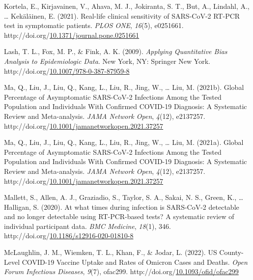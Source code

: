 \documentclass[12pt,twoside]{smiththesis}
\newlength{\cslhangindent}
\newenvironment{CSLReferences}[2] %
 {%
\setlength{\parindent}{0pt}
\ifodd #1 \everypar{\setlength{\hangindent}{\cslhangindent}}\ignorespaces\fi
\ifnum #2 > 0
\setlength{\parskip}{#2\baselineskip}
  \fi
}%
{}
\begin{document}
\begin{CSLReferences}{1}{0}
\leavevmode{}%
Kortela, E., Kirjavainen, V., Ahava, M. J., Jokiranta, S. T., But, A., Lindahl, A., \ldots{} Kekäläinen, E. (2021). Real-life clinical sensitivity of {SARS-CoV-2 RT-PCR} test in symptomatic patients. \emph{PLOS ONE}, \emph{16}(5), e0251661. http://doi.org/\href{https://doi.org/10.1371/journal.pone.0251661}{10.1371/journal.pone.0251661}

\leavevmode{}%
Lash, T. L., Fox, M. P., \& Fink, A. K. (2009). \emph{Applying {Quantitative Bias Analysis} to {Epidemiologic Data}}. {New York, NY}: {Springer New York}. http://doi.org/\href{https://doi.org/10.1007/978-0-387-87959-8}{10.1007/978-0-387-87959-8}

\leavevmode{}%
Ma, Q., Liu, J., Liu, Q., Kang, L., Liu, R., Jing, W., \ldots{} Liu, M. (2021b). Global {Percentage} of {Asymptomatic SARS-CoV-2 Infections Among} the {Tested Population} and {Individuals With Confirmed COVID-19 Diagnosis}: {A Systematic Review} and {Meta-analysis}. \emph{JAMA Network Open}, \emph{4}(12), e2137257. http://doi.org/\href{https://doi.org/10.1001/jamanetworkopen.2021.37257}{10.1001/jamanetworkopen.2021.37257}

\leavevmode{}%
Ma, Q., Liu, J., Liu, Q., Kang, L., Liu, R., Jing, W., \ldots{} Liu, M. (2021a). Global {Percentage} of {Asymptomatic SARS-CoV-2 Infections Among} the {Tested Population} and {Individuals With Confirmed COVID-19 Diagnosis}: {A Systematic Review} and {Meta-analysis}. \emph{JAMA Network Open}, \emph{4}(12), e2137257. http://doi.org/\href{https://doi.org/10.1001/jamanetworkopen.2021.37257}{10.1001/jamanetworkopen.2021.37257}

\leavevmode{}%
Mallett, S., Allen, A. J., Graziadio, S., Taylor, S. A., Sakai, N. S., Green, K., \ldots{} Halligan, S. (2020). At what times during infection is {SARS-CoV-2} detectable and no longer detectable using {RT-PCR-based} tests? {A} systematic review of individual participant data. \emph{BMC Medicine}, \emph{18}(1), 346. http://doi.org/\href{https://doi.org/10.1186/s12916-020-01810-8}{10.1186/s12916-020-01810-8}

\leavevmode{}%
McLaughlin, J. M., Wiemken, T. L., Khan, F., \& Jodar, L. (2022). {US County-Level COVID-19 Vaccine Uptake} and {Rates} of {Omicron Cases} and {Deaths}. \emph{Open Forum Infectious Diseases}, \emph{9}(7), ofac299. http://doi.org/\href{https://doi.org/10.1093/ofid/ofac299}{10.1093/ofid/ofac299}


\end{CSLReferences}
\end{document}
